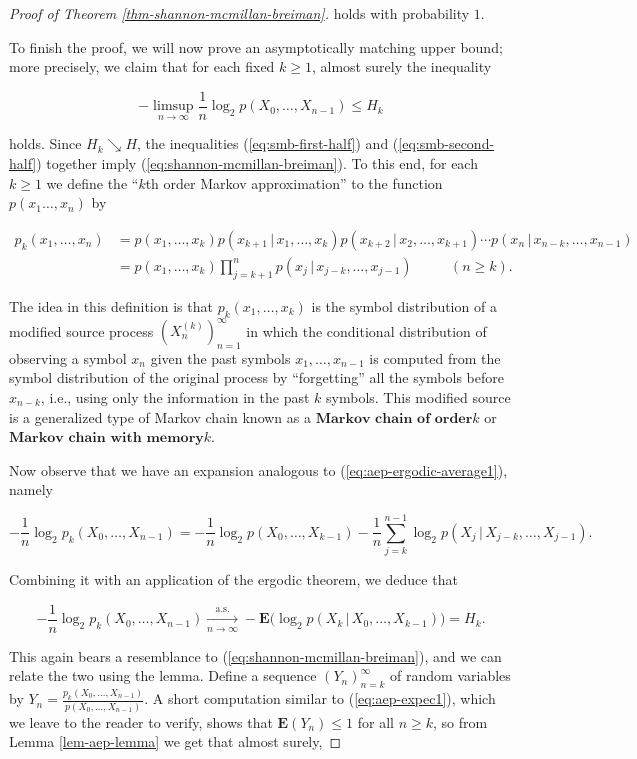 \begin{proof}[Proof of Theorem \ref{thm-shannon-mcmillan-breiman}]
\noindent holds with probability $1$.

To finish the proof, we will now prove an
asymptotically matching upper bound; more precisely,
we claim that for each fixed $k\ge1$, almost surely
the inequality

\begin{equation*} \tag{41}\label{eq:smb-second-half}
-\limsup_{n\to\infty} \frac{1}{n} \log_2 p(X_0,\ldots,X_{n-1}) \le H_k
\end{equation*}

\noindent holds. Since $H_k \searrow H$, the inequalities
(\ref{eq:smb-first-half}) and (\ref{eq:smb-second-half})
together imply (\ref{eq:shannon-mcmillan-breiman}). To
this end, for each $k\ge 1$ we define the ``$k$th
order Markov approximation'' to the function
$p(x_1\ldots,x_n)$ by

\begin{align*}
p_k(x_1,\ldots,x_n) &= p(x_1,\ldots,x_k) p(x_{k+1}\,|\,x_1,\ldots,x_k)
p(x_{k+2}\,|\,x_2,\ldots,x_{k+1}) \cdots p(x_n\,|\, x_{n-k},\ldots, x_{n-1}) \\ &= p(x_1,\ldots,x_k)
\prod_{j=k+1}^n p(x_j\,|\, x_{j-k},\ldots,x_{j-1}) \qquad \ \ \ (n\ge k).
\end{align*}

\noindent The idea in this definition is that
$p_k(x_1,\ldots,x_k)$ is the symbol distribution of a
modified source process $(X_n^{(k)})_{n=1}^\infty$ in
which the conditional distribution of observing a
symbol $x_n$ given the past symbols
$x_1,\ldots,x_{n-1}$ is computed from the symbol
distribution of the original process by ``forgetting''
all the symbols before $x_{n-k}$, i.e., using only
the information in the past $k$ symbols. This
modified source is a generalized type of Markov chain
known as a $\textbf{Markov chain of order$k$}$ or
$\textbf{Markov chain with memory$k$}$.

Now observe that we have an expansion analogous to
(\ref{eq:aep-ergodic-average1}), namely

\[
-\frac{1}{n} \log_2 p_k(X_0,\ldots,X_{n-1}) = -\frac{1}{n} \log_2 p(X_0,\ldots,X_{k-1}) - \frac{1}{n} \sum_{j=k}^{n-1} \log_2 p(X_j\,|\,X_{j-k},\ldots,X_{j-1}).
\]

\noindent Combining it with an application of the ergodic
theorem, we deduce that

\[
-\frac{1}{n} \log_2 p_k(X_0,\ldots,X_{n-1}) \xrightarrow[n\to\infty]{\textrm{a.s.}} -\mathbf{E} \big(\log_2 p(X_k\,|\,X_0,\ldots,X_{k-1})\big) = H_k.
\]

\noindent This again bears a resemblance to
(\ref{eq:shannon-mcmillan-breiman}), and we can relate the
two using the lemma. Define a sequence
$(Y_n)_{n=k}^\infty$ of random variables by
$Y_n =
\frac{p_k(X_0,\ldots,X_{n-1})}{p(X_0,\ldots,X_{n-1})}$.
A short computation similar to (\ref{eq:aep-expec1}),
which we leave to the reader to verify, shows that
$\mathbf{E}(Y_n) \le 1$ for all $n\ge k$, so from
Lemma \ref{lem-aep-lemma} we get that almost surely,


\end{proof}
